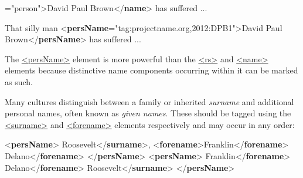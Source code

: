 \begin{shaded}
{\hspace*{1em}{type}="{person}">}David Paul Brown{</\textbf{name}>} has suffered ...\end{shaded}\egroup\par \noindent  \par\bgroup{}\exampleFont \begin{shaded}\noindent\mbox{}That silly man {<\textbf{persName}\hspace*{1em}{ref}="{tag:projectname.org,2012:DPB1}">}David Paul\mbox{}\newline 
 Brown{</\textbf{persName}>} has suffered ...\end{shaded}\egroup\par \par
The \hyperref[TEI.persName]{<persName>} element is more powerful than the \hyperref[TEI.rs]{<rs>} and \hyperref[TEI.name]{<name>} elements because distinctive name components occurring within it can be marked as such.\par
Many cultures distinguish between a family or inherited \textit{surname} and additional personal names, often known as \textit{given names}. These should be tagged using the \hyperref[TEI.surname]{<surname>} and \hyperref[TEI.forename]{<forename>} elements respectively and may occur in any order: \par\bgroup{}\exampleFont \begin{shaded}\noindent\mbox{}{<\textbf{persName}>}\mbox{}\newline 
{}Roosevelt{</\textbf{surname}>}, {<\textbf{forename}>}Franklin{</\textbf{forename}>}\mbox{}\newline 
{}Delano{</\textbf{forename}>}\mbox{}\newline 
{</\textbf{persName}>}\mbox{}\newline 
{<\textbf{persName}>}\mbox{}\newline 
{}Franklin{</\textbf{forename}>}\mbox{}\newline 
{}Delano{</\textbf{forename}>}\mbox{}\newline 
{}Roosevelt{</\textbf{surname}>}\mbox{}\newline 
{</\textbf{persName}>}\end{shaded}\egroup\par \par

